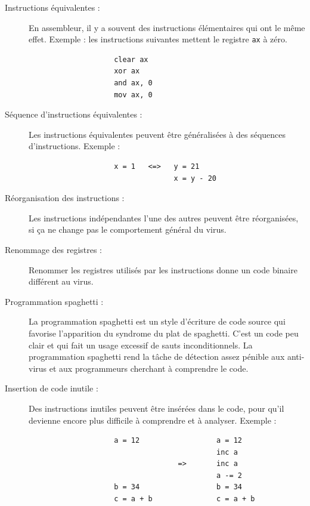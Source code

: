         \begin{description}
            \item[Instructions équivalentes :] En assembleur, il y a souvent des instructions élémentaires qui ont 
                le même effet. Exemple : les instructions suivantes mettent le registre \verb|ax| à zéro. %
                \begin{verbatim}
                    clear ax
                    xor ax
                    and ax, 0
                    mov ax, 0
                \end{verbatim}

            \item[Séquence d'instructions équivalentes :] Les instructions équivalentes peuvent être généralisées à
                des séquences d'instructions. Exemple : %
                \begin{verbatim}
                    x = 1   <=>   y = 21
                                  x = y - 20
                \end{verbatim}
            \item[Réorganisation des instructions :] Les instructions indépendantes l'une des autres peuvent 
                être réorganisées, si ça ne change pas le comportement général du virus.

            \item[Renommage des registres :] Renommer les registres utilisés par les instructions donne un code binaire
                différent au virus. %

            \item[Programmation spaghetti :] La programmation spaghetti est un style d'écriture de code source qui
                favorise l'apparition du syndrome du plat de spaghetti. C'est un code peu clair et qui fait un 
                usage excessif de sauts inconditionnels. La programmation spaghetti rend la tâche de détection 
                assez pénible aux anti-virus et aux programmeurs cherchant à comprendre le code. %

            \item[Insertion de code inutile :] Des instructions inutiles peuvent être insérées dans le code, pour qu'il
                devienne encore plus  difficile à comprendre et à analyser. Exemple :
                \begin{verbatim}
                    a = 12                  a = 12
                                            inc a
                                   =>       inc a
                                            a -= 2
                    b = 34                  b = 34
                    c = a + b               c = a + b
                \end{verbatim}
        \end{description}


